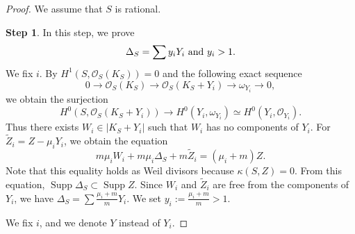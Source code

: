 \documentclass[12pt,twoside]{amsart}
\newcommand{\Supp}[0]{{\operatorname{Supp}}}
\theoremstyle{definition}
\newtheorem{step}{Step}
\begin{document}
\begin{proof}
We assume that $S$ is rational.


\begin{step}
In this step, we prove 
$$\Delta_S=\sum y_iY_i \,\,{\rm and}\,\, y_i>1. $$
We fix $i$. 
By $H^1(S, \mathcal O_S(K_S))=0$ and the following exact sequence 
$$
0 \to \mathcal O_S(K_S) \to \mathcal O_S(K_S+Y_i) 
\to \omega_{Y_i} \to 0,$$
we obtain the surjection 
$$H^0(S, \mathcal O_S(K_S+Y_i)) \to H^0(Y_i, \omega_{Y_i})\simeq H^0(Y_i, \mathcal O_{Y_i}).$$
Thus there exists $W_i \in |K_S+Y_i|$ such that 
$W_i$ has no components of $Y_i$. 
For $\tilde{Z}_i=Z-\mu_iY_i$, we obtain the equation 
$$m\mu_iW_i+m\mu_i\Delta_S+m\tilde{Z}_i=(\mu_i+m)Z.$$ 
Note that this equality holds as Weil divisors because 
$\kappa(S, Z)=0$. 
From this equation, $\Supp\Delta_S \subset \Supp Z$. 
Since $W_i$ and $\tilde{Z}_i$ are free from the components of $Y_i$, 
we have $\Delta_S=\sum\frac{\mu_i+m}{m}Y_i$. 
We set $y_i:=\frac{\mu_i+m}{m}>1$. 
\end{step}

We fix $i$, and we denote $Y$ instead of $Y_i$. 


\end{proof}
\end{document}
